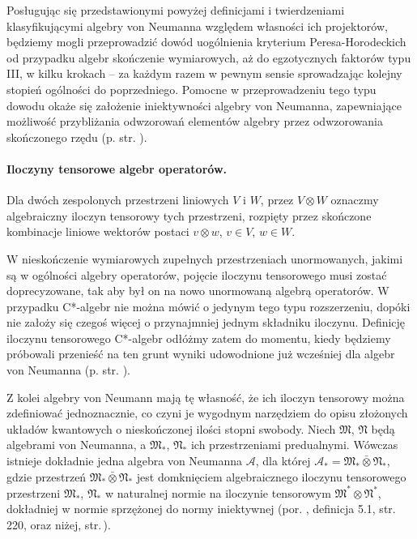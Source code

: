 Posługując się przedstawionymi powyżej definicjami i twierdzeniami klasyfikującymi
algebry von Neumanna
względem własności ich projektorów,
będziemy mogli przeprowadzić dowód uogólnienia kryterium Peresa-Horodeckich
od przypadku algebr skończenie wymiarowych,
aż do egzotycznych faktorów typu III,
w kilku krokach -- za każdym razem w pewnym sensie
sprowadzając kolejny stopień ogólności do poprzedniego.
Pomocne w przeprowadzeniu tego typu dowodu okaże się założenie iniektywności
algebry von Neumanna, zapewniające możliwość przybliżania odwzorowań
elementów algebry przez odwzorowania skończonego rzędu
(p. str. \pageref{def:injectivevNalg}).

\paragraph{Iloczyny tensorowe algebr operatorów.}
Dla dwóch zespolonych przestrzeni liniowych $V$ i $W$,
przez $V \! \otimes \! W$ oznaczmy algebraiczny iloczyn tensorowy tych przestrzeni,
rozpięty przez skończone kombinacje liniowe wektorów postaci
$v \otimes w$, $v \in V$, $w \in W$.

W nieskończenie wymiarowych zupełnych przestrzeniach unormowanych,
jakimi są w ogólności algebry operatorów,
pojęcie iloczynu tensorowego musi zostać doprecyzowane, tak aby
był on na nowo unormowaną algebrą operatorów.
W przypadku C*-algebr nie można mówić o jedynym tego typu rozszerzeniu,
dopóki nie założy się czegoś więcej o przynajmniej jednym składniku iloczynu.
Definicję iloczynu tensorowego C*-algebr odłóżmy zatem do momentu,
kiedy będziemy próbowali przenieść na ten grunt wyniki udowodnione już
wcześniej dla algebr von Neumanna (p. str. \pageref{sec:HorCstar}).

Z kolei algebry von Neumann mają tę własność, że ich iloczyn
tensorowy można zdefiniować jednoznacznie,
co czyni je wygodnym narzędziem do opisu złożonych układów kwantowych
o nieskończonej ilości stopni swobody.
Niech $\mathfrak{M}$, $\mathfrak{N}$ będą algebrami von Neumanna,
a $\mathfrak{M}_{*}$, $\mathfrak{N}_{*}$ ich przestrzeniami predualnymi.
Wówczas istnieje dokładnie jedna algebra von Neumanna $\mathcal{A}$,
dla której
$\mathcal{A}_{*} = \mathfrak{M}_{*} \bar{\otimes} \mathfrak{N}_{*}$,
gdzie przestrzeń
$\mathfrak{M}_{*} \bar{\otimes} \mathfrak{N}_{*}$ jest domknięciem
algebraicznego iloczynu tensorowego przestrzeni
$\mathfrak{M}_{*}$, $\mathfrak{N}_{*}$ w naturalnej normie na iloczynie
tensorowym $\mathfrak{M}^{*} \otimes \mathfrak{N}^{*}$,
dokładniej w normie sprzężonej do normy iniektywnej
(por. \cite{Takesaki1}, definicja 5.1, str. 220, oraz niżej,
str.\,\pageref{def:projectiveoperatornorm}).

